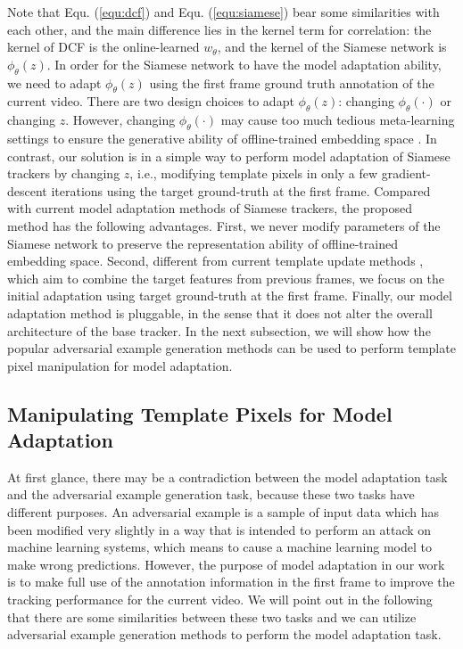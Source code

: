 Note that Equ. (\ref{equ:dcf}) and Equ. (\ref{equ:siamese}) bear some similarities with each other, and the main difference lies in the kernel term for correlation: the kernel of DCF is the online-learned $w_{\theta}$, and the kernel of the Siamese network is $\phi_\theta(z)$. In order for the Siamese network to have the model adaptation ability, we need to adapt $\phi_\theta(z)$ using the first frame ground truth annotation of the current video. There are two design choices to adapt $\phi_\theta(z)$: changing $\phi_\theta(\cdot)$ or changing $z$. However, changing $\phi_\theta(\cdot)$ may cause too much tedious meta-learning settings to ensure the generative ability of offline-trained embedding space \cite{ROAM, DBLP:conf/aaai/JungYNCH20}. In contrast, our solution is in a simple way to perform model adaptation of Siamese trackers by changing $z$, i.e., modifying template pixels in only a few gradient-descent iterations using the target ground-truth at the first frame. Compared with current model adaptation methods of Siamese trackers, the proposed method has the following advantages. First, we never modify parameters of the Siamese network to preserve the representation ability of offline-trained embedding space. Second, different from current template update methods \cite{zhu2018distractor, Zhang_2019_ICCV}, which aim to combine the target features from previous frames, we focus on the initial adaptation using target ground-truth at the first frame. Finally, our model adaptation method is pluggable, in the sense that it does not alter the overall architecture of the base tracker. In the next subsection, we will show how the popular adversarial example generation methods can be used to perform template pixel manipulation for model adaptation.

\subsection{Manipulating Template Pixels for Model Adaptation}
At first glance, there may be a contradiction between the model adaptation task and the adversarial example generation task, because these two tasks have different purposes. An adversarial example \cite{kurakin2017adversarial} is a sample of input data which has been modified very slightly in a way that is intended to perform an attack on machine learning systems, which means to cause a machine learning model to make wrong predictions. However, the purpose of model adaptation in our work is to make full use of the annotation information in the first frame to improve the tracking performance for the current video. We will point out in the following that there are some similarities between these two tasks and we can utilize adversarial example generation methods to perform the model adaptation task.

